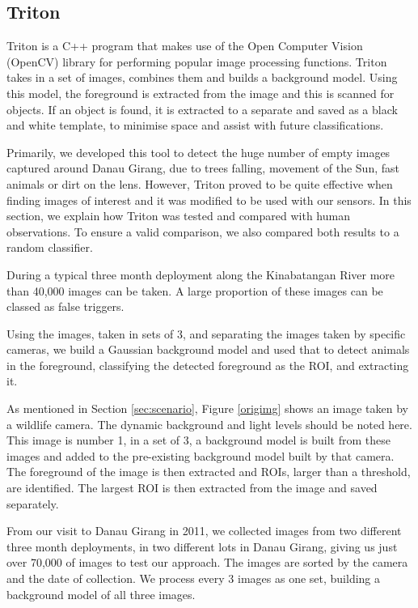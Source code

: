 	\subsection{Triton} \label{tech:sf:triton}
		Triton is a C++ program that makes use of the Open Computer Vision (OpenCV) library for performing popular image processing functions. Triton takes in a set of images, combines them and builds a background model. Using this model, the foreground is extracted from the image and this is scanned for objects. If an object is found, it is extracted to a separate and saved as a black and white template, to minimise space and assist with future classifications.
		
		Primarily, we developed this tool to detect the huge number of empty images captured around Danau Girang, due to trees falling, movement of the Sun, fast animals or dirt on the lens. However, Triton proved to be quite effective when finding images of interest and it was modified to be used with our sensors. In this section, we explain how Triton was tested and compared with human observations. To ensure a valid comparison, we also compared both results to a random classifier.
	
		During a typical three month deployment along the Kinabatangan River more than 40,000 images can be taken. A large proportion of these images can be classed as false triggers. 
		
		Using the images, taken in sets of 3, and separating the images taken by specific cameras, we build a Gaussian background model and used that to detect animals in the foreground, classifying the detected foreground as the ROI, and extracting it.
	
		As mentioned in Section \ref{sec:scenario}, Figure \ref{origimg} shows an image taken by a wildlife camera. The dynamic background and light levels should be noted here. This image is number 1, in a set of 3, a background model is built from these images and added to the pre-existing background model built by that camera. The foreground of the image is then extracted and ROIs, larger than a threshold, are identified. The largest ROI is then extracted from the image and saved separately.
	
		From our visit to Danau Girang in 2011, we collected images from two different three month deployments, in two different lots in Danau Girang, giving us just over 70,000 of images to test our approach. The images are sorted by the camera and the date of collection. We process every 3 images as one set, building a background model of all three images.
		
